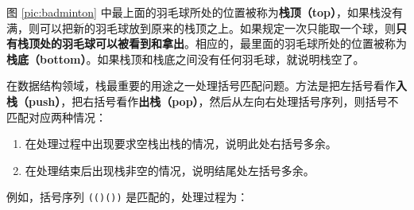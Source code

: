 图 \ref{pic:badminton} 中最上面的羽毛球所处的位置被称为\textbf{栈顶（top）}，如果栈没有满，则可以把新的羽毛球放到原来的栈顶之上。如果规定一次只能取一个球，则\textbf{只有栈顶处的羽毛球可以被看到和拿出}。相应的，最里面的羽毛球所处的位置被称为\textbf{栈底（bottom）}。如果栈顶和栈底之间没有任何羽毛球，就说明栈空了。

在数据结构领域，栈最重要的用途之一处理括号匹配问题。方法是把左括号看作\textbf{入栈（push）}，把右括号看作\textbf{出栈（pop）}，然后从左向右处理括号序列，则括号不匹配对应两种情况：

\begin{enumerate}
	\item 在处理过程中出现要求空栈出栈的情况，说明此处右括号多余。
	\item 在处理结束后出现栈非空的情况，说明结尾处左括号多余。
\end{enumerate}

例如，括号序列 \lstinline{(()())} 是匹配的，处理过程为：

